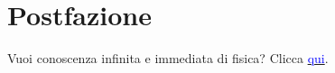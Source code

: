 \newpage
\chapter*{Postfazione}
Vuoi conoscenza infinita e immediata di fisica? Clicca \href{https://www.youtube.com/watch?v=dQw4w9WgXcQ}{\textcolor{blue}{qui}}.